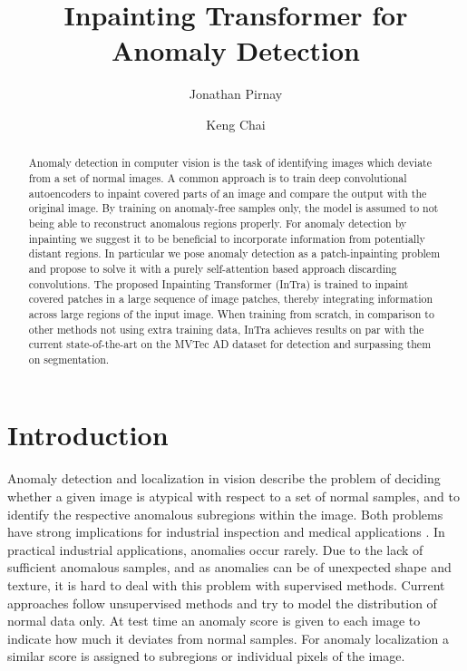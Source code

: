 \documentclass[runningheads]{llncs}
\begin{document}
\renewcommand{\vec}[1]{\boldsymbol{\mathrm{#1}}}
\title{Inpainting Transformer for Anomaly Detection}
\author{Jonathan Pirnay \and
Keng Chai}
\maketitle              \begin{abstract}
Anomaly detection in computer vision is the task of identifying images which deviate from a set of normal images. A common approach is to train deep convolutional autoencoders to inpaint covered parts of an image and compare the output with the original image. By training on anomaly-free samples only, the model is assumed to not being able to reconstruct anomalous regions properly. For anomaly detection by inpainting we suggest it to be beneficial to incorporate information from potentially distant regions. In particular we pose anomaly detection as a patch-inpainting problem and propose to solve it with a purely self-attention based approach discarding convolutions. The proposed Inpainting Transformer (InTra) is trained to inpaint covered patches in a large sequence of image patches, thereby integrating information across large regions of the input image. When training from scratch, in comparison to other methods not using extra training data, InTra achieves results on par with the current state-of-the-art on the MVTec AD dataset for detection and surpassing them on segmentation.

\end{abstract}



\section{Introduction}
\label{section:introduction}

Anomaly detection and localization in vision describe the problem of deciding whether a given image is atypical with respect to a set of normal samples, and to identify the respective anomalous subregions within the image. Both problems have strong implications for industrial inspection \cite{MvtecAd2019} and medical applications \cite{fernando2020deep}. In practical industrial applications, anomalies occur rarely. Due to the lack of sufficient anomalous samples, and as anomalies can be of unexpected shape and texture, it is hard to deal with this problem with supervised methods. Current approaches follow unsupervised methods and try to model the distribution of normal data only. At test time an anomaly score is given to each image to indicate how much it deviates from normal samples. For anomaly localization a similar score is assigned to subregions or individual pixels of the image.
\end{document}
